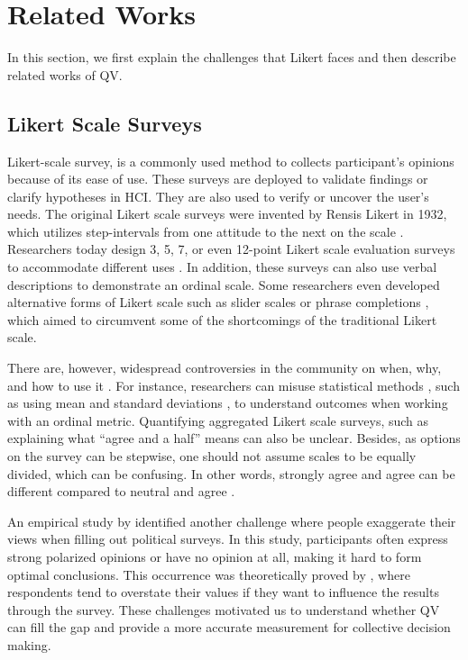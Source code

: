 \section{Related Works} \label{related_works}
In this section, 
we first explain the challenges
that Likert faces
and then describe related works of QV.

\subsection{Likert Scale Surveys}
Likert-scale survey, 
is a commonly used method 
to collects participant's opinions
because of its ease of use.
These surveys are deployed
to validate findings or clarify hypotheses
\cite{ozok2009survey, ledo2018evaluation} in HCI.
They are also used to verify or uncover the user's needs.
The original Likert scale surveys
were invented by Rensis Likert in 1932, 
which utilizes step-intervals 
from one attitude to the next 
on the scale \cite{likert1932technique}.
Researchers today design 3, 5, 7, 
or even 12-point Likert scale evaluation surveys to accommodate different uses
\cite{garland2008computer,finstad2010}.
In addition, these surveys
can also use verbal descriptions
to demonstrate an ordinal scale.
Some researchers even developed 
alternative forms of Likert scale 
such as slider scales \cite{roster2015exploring} 
or phrase completions \cite{hodge2003phrase}, 
which aimed to circumvent 
some of the shortcomings of the traditional Likert scale.

There are, however, widespread controversies in the community on
when, why, and how to use it \cite{bishop2015use}.
For instance, 
researchers can misuse statistical methods
, such as using mean and standard deviations \cite{jamieson2004likert},
to understand outcomes
when working with an ordinal metric.
Quantifying aggregated Likert scale surveys,
such as explaining what ``agree and a half'' means
can also be unclear.
Besides, 
as options on the survey can be stepwise,
one should not assume scales to be equally divided,
which can be confusing.
In other words, 
strongly agree and agree can be different compared to
neutral and agree \cite{jamieson2004likert, edmondson2005likert}.

An empirical study by \textcite{quarfoot2017quadratic}
identified another challenge
where people exaggerate their views
when filling out political surveys.
In this study,
participants often express strong polarized opinions
or have no opinion at all,
making it hard to form optimal conclusions\cite{posner2018radical}.
This occurrence was 
theoretically proved by \textcite{cavaille2018towards},
where respondents tend to overstate their values
if they want to influence the results through the survey.
These challenges motivated us 
to understand whether QV can fill the gap
and provide a more accurate measurement
for collective decision making.\par


